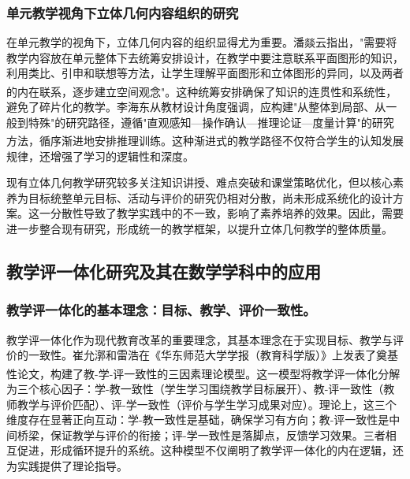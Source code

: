 \documentclass[UTF8,a4paper,12pt,twoside]{ctexart}
\begin{document}
\subsubsection{单元教学视角下立体几何内容组织的研究}
在单元教学的视角下，立体几何内容的组织显得尤为重要。潘燚云指出，"需要将教学内容放在单元整体下去统筹安排设计，在教学中要注意联系平面图形的知识，利用类比、引申和联想等方法，让学生理解平面图形和立体图形的异同，以及两者的内在联系，逐步建立空间观念"\textsuperscript{\cite{pan2025}}。这种统筹安排确保了知识的连贯性和系统性，避免了碎片化的教学。李海东从教材设计角度强调，应构建"从整体到局部、从一般到特殊"的研究路径，遵循"直观感知—操作确认—推理论证—度量计算"的研究方法，循序渐进地安排推理训练\textsuperscript{\cite{li2019}}。这种渐进式的教学路径不仅符合学生的认知发展规律，还增强了学习的逻辑性和深度。

现有立体几何教学研究较多关注知识讲授、难点突破和课堂策略优化，但以核心素养为目标统整单元目标、活动与评价的研究仍相对分散，尚未形成系统化的设计方案。这一分散性导致了教学实践中的不一致，影响了素养培养的效果。因此，需要进一步整合现有研究，形成统一的教学框架，以提升立体几何教学的整体质量。

\subsection{教学评一体化研究及其在数学学科中的应用}

\subsubsection{教学评一体化的基本理念：目标、教学、评价一致性。}
教学评一体化作为现代教育改革的重要理念，其基本理念在于实现目标、教学与评价的一致性。崔允漷和雷浩在《华东师范大学学报（教育科学版）》上发表了奠基性论文，构建了教-学-评一致性的三因素理论模型\textsuperscript{\cite{cui_lei2015}}。这一模型将教学评一体化分解为三个核心因子：学-教一致性（学生学习围绕教学目标展开）、教-评一致性（教师教学与评价匹配）、评-学一致性（评价与学生学习成果对应）。理论上，这三个维度存在显著正向互动：学-教一致性是基础，确保学习有方向；教-评一致性是中间桥梁，保证教学与评价的衔接；评-学一致性是落脚点，反馈学习效果。三者相互促进，形成循环提升的系统。这种模型不仅阐明了教学评一体化的内在逻辑，还为实践提供了理论指导。
\end{document}
